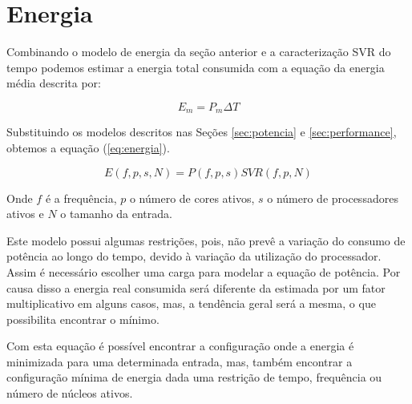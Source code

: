 \section{Energia} \label{sec:energia}

Combinando o modelo de energia da seção anterior e a caracterização SVR do tempo podemos estimar a energia total consumida com a equação da energia média descrita por:

\begin{equation}
E_m=P_m\Delta T
\end{equation}

Substituindo os modelos descritos nas Seções \ref{sec:potencia} e \ref{sec:performance}, obtemos a equação (\ref{eq:energia}).

\begin{equation}
E(f,p,s,N)=P(f,p,s)SVR(f,p,N)
\label{eq:energia}
\end{equation}

Onde $f$ é a frequência, $p$ o número de cores ativos, $s$ o número de processadores ativos e $N$ o tamanho da entrada.

Este modelo possui algumas restrições, pois, não prevê a variação do consumo de potência ao longo do tempo, devido à variação da utilização do processador. Assim é necessário escolher uma carga para modelar a equação de potência. Por causa disso a energia real consumida será diferente da estimada por um fator multiplicativo em alguns casos, mas, a tendência geral será a mesma, o que possibilita encontrar o mínimo.

Com esta equação é possível encontrar a configuração onde a energia é minimizada para uma determinada entrada, mas, também encontrar a configuração mínima de energia dada uma restrição de tempo, frequência ou número de núcleos ativos.